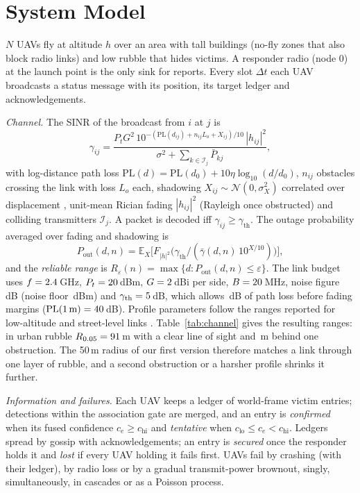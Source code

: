 \documentclass[conference]{IEEEtran}
\begin{document}
\section{System Model}\label{sec:model}
$N$ UAVs fly at altitude $h$ over an area with tall buildings (no-fly zones that also block radio
links) and low rubble that hides victims. A responder radio (node 0) at the launch point is the only
sink for reports. Every slot $\Delta t$ each UAV broadcasts a status message with its position, its
target ledger and acknowledgements.

\emph{Channel.} The SINR of the broadcast from $i$ at $j$ is
\begin{equation}
\gamma_{ij}=\frac{P_t G^2\,10^{-(\mathrm{PL}(d_{ij})+n_{ij}L_o+X_{ij})/10}\,|h_{ij}|^2}{\sigma^2+\sum_{k\in\mathcal{I}_j}\bar P_{kj}},\label{eq:sinr}
\end{equation}
with log-distance path loss $\mathrm{PL}(d)=\mathrm{PL}(d_0)+10\eta\log_{10}(d/d_0)$, $n_{ij}$
obstacles crossing the link with loss $L_o$ each, shadowing $X_{ij}\sim\mathcal{N}(0,\sigma_X^2)$
correlated over displacement \cite{gudmundson1991}, unit-mean Rician fading $|h_{ij}|^2$ (Rayleigh
once obstructed) and colliding transmitters $\mathcal{I}_j$. A packet is decoded iff
$\gamma_{ij}\ge\gamma_{\mathrm{th}}$. The outage probability averaged over fading and shadowing is
\begin{equation}
P_{\mathrm{out}}(d,n)=\mathbb{E}_X\big[F_{|h|^2}\big(\gamma_{\mathrm{th}}/(\bar\gamma(d,n)\,10^{X/10})\big)\big],\label{eq:pout}
\end{equation}
and the \emph{reliable range} is $R_\varepsilon(n)=\max\{d:P_{\mathrm{out}}(d,n)\le\varepsilon\}$.
The link budget uses $f=2.4$\,GHz, $P_t=20$\,dBm, $G=2$\,dBi per side, $B=20$\,MHz,
noise figure \nNF\,dB (noise floor \nNoise\,dBm) and $\gamma_{\mathrm{th}}=5$\,dB, which allows
\nBudget\,dB of path loss before fading margins ($\mathrm{PL}(1\,\mathrm{m})=40$\,dB). Profile
parameters follow the ranges reported for low-altitude and street-level links
\cite{tr36777,itup1411}. Table~\ref{tab:channel} gives the resulting ranges: in urban rubble
$R_{0.05}=91$\,m with a clear line of sight and \nRurbanOne\,m behind one obstruction. The
50\,m radius of our first version therefore matches a link through one layer of rubble, and a second
obstruction or a harsher profile shrinks it further.


\emph{Information and failures.} Each UAV keeps a ledger of world-frame victim entries; detections
within the association gate are merged, and an entry is \emph{confirmed} when its fused confidence
$c_e\ge c_{\mathrm{hi}}$ and \emph{tentative} when $c_{\mathrm{lo}}\le c_e<c_{\mathrm{hi}}$. Ledgers
spread by gossip with acknowledgements; an entry is \emph{secured} once the responder holds it and
\emph{lost} if every UAV holding it fails first. UAVs fail by crashing (with their ledger), by radio
loss or by a gradual transmit-power brownout, singly, simultaneously, in cascades or as a Poisson
process.
\end{document}
